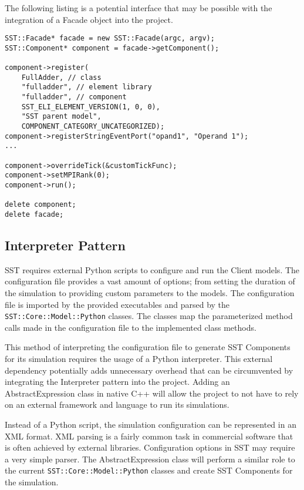 The following listing is a potential interface that may be possible with the integration of a Facade object into the project.

\begin{lstlisting}[style=customC++,label=facade,caption=Potential Implementation of Facade]
SST::Facade* facade = new SST::Facade(argc, argv);
SST::Component* component = facade->getComponent();

component->register(
    FullAdder, // class
    "fulladder", // element library
    "fulladder", // component
    SST_ELI_ELEMENT_VERSION(1, 0, 0),
    "SST parent model",
    COMPONENT_CATEGORY_UNCATEGORIZED);
component->registerStringEventPort("opand1", "Operand 1");
...

component->overrideTick(&customTickFunc);
component->setMPIRank(0);
component->run();

delete component;
delete facade;
\end{lstlisting}

\newpage
\subsection{Interpreter Pattern}
SST requires external Python scripts to configure and run the Client models. The configuration file provides a vast amount of options; from setting the duration of the simulation to providing custom parameters to the models. The configuration file is imported by the provided executables and parsed by the \texttt{SST::Core::Model::Python} classes. The classes map the parameterized method calls made in the configuration file to the implemented class methods.

This method of interpreting the configuration file to generate SST Components for its simulation requires the usage of a Python interpreter. This external dependency potentially adds unnecessary overhead that can be circumvented by integrating the Interpreter pattern into the project. Adding an AbstractExpression class in native C++ will allow the project to not have to rely on an external framework and language to run its simulations.

Instead of a Python script, the simulation configuration can be represented in an XML format. XML parsing is a fairly common task in commercial software that is often achieved by external libraries. Configuration options in SST may require a very simple parser. The AbstractExpression class will perform a similar role to the current \texttt{SST::Core::Model::Python} classes and create SST Components for the simulation.

